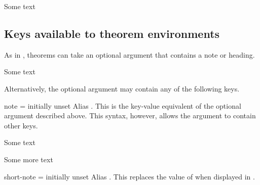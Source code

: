 \documentclass{ltxdoc}
\begin{document}
\begin{tcbwritetemp}
\end{tcbwritetemp}

\begin{keythmscode}[withpreamble]
\begin{theorem}
Some text
\end{theorem}
\end{keythmscode}

\subsection{Keys available to theorem environments} \label{in-doc-keys}

As in , theorems can take an optional argument that contains a note or heading.

\begin{keythmscode}[]
\begin{theorem}
Some text
\end{theorem}
\end{keythmscode}

Alternatively, the optional argument may contain any of the following keys.

\begin{docKey}{note}
  {=}
  {initially unset}
Alias .
This is the key-value equivalent of the optional argument described above.
This syntax, however, allows the argument to contain other keys.

\begin{keythmscode}[]
\begin{theorem}
Some text
\end{theorem}
\begin{theorem}[note=another heading]
Some more text
\end{theorem}
\end{keythmscode}

\end{docKey}

\begin{docKey}{short-note}
  {=}
  {initially unset}
Alias .
This replaces the value of  when displayed in .
\end{docKey}

\end{document}
